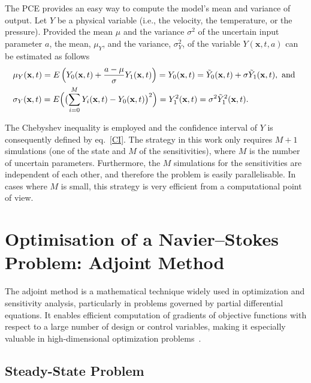 The PCE provides an easy way to compute the model's mean and variance of output. Let $Y$ be a physical variable (i.e., the velocity, the temperature, or the pressure). Provided the mean $\mu$ and the variance $\sigma^2$ of the uncertain input parameter $a$, the mean, $\mu_Y $, and the variance, $\sigma_Y^2$, of the variable $Y(\mathbf{x},t, a)$ can be estimated as follows
 \begin{align}
& \mu_Y(\textbf{x},t)=E\left( Y_0(\textbf{x},t)+\frac{a - \mu}{\sigma}Y_1(\textbf{x},t)\right) = Y_0(\textbf{x},t) = \tilde Y_0(\textbf{x},t)+ \sigma \tilde Y_1(\textbf{x},t), \text{ and } \\
&\sigma_Y(\textbf{x},t)= E\Bigl( \bigl( \displaystyle\sum_{i=0}^M Y_i(\textbf{x},t) - Y_0(\textbf{x},t) \bigr)^2\Bigr)  =  Y_1^2(\textbf{x},t) =  \sigma^2 \tilde Y_1^2(\textbf{x},t).
\label{variance_univaraite_uncertain_temp_6}
\end{align}

The Chebyshev inequality is employed and the confidence interval of $Y$ is consequently defined by eq.~\eqref{CI}. The strategy in this
work only requires $M+1$ simulations (one of the state and $M$ of the sensitivities), where $M$ is the number of uncertain parameters. Furthermore, the $M$
simulations for the sensitivities are independent of each other, and therefore
the problem is easily parallelisable. In cases where $M$ is small, this strategy is
very efficient from a computational point of view.





\chapter{Optimisation of a Navier–Stokes Problem: Adjoint Method}
\label{sec_adjoint}

The adjoint method is a mathematical technique widely used in optimization and sensitivity analysis, particularly in problems governed by partial differential equations. It enables efficient computation of gradients of objective functions with respect to a large number of design or control variables, making it especially valuable in high-dimensional optimization problems~\cite{giles2000introduction}.

\section{Steady-State Problem}


